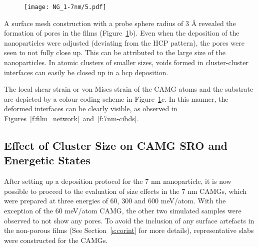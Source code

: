 \begin{figure}[!h] \centering
	\texttt{[image: NG\_1-7nm/5.pdf]}
	\label{f:7nm-cibdpores}
\end{figure}

A surface mesh construction \cite{Stukowski2010a,Stukowski2014} with a probe sphere radius of 3 \r{A} revealed the formation of pores in the films (Figure~\ref{f:7nm-cibdpores}b). Even when the deposition of the nanoparticles were adjusted (deviating from the HCP pattern), the pores were seen to not fully close up. This can be attributed to the large size of the nanoparticles. In atomic clusters of smaller sizes, voids formed in cluster-cluster interfaces can easily be closed up in a \gls{hcp} deposition. \par

The local shear strain or von Mises strain of the CAMG atoms and the substrate are depicted by a colour coding scheme in Figure~\ref{f:7nm-cibdpores}c. In this manner, the deformed interfaces can be clearly visible, as observed in Figures~\ref{f:film_network}~and~\ref{f:7nm-cibds}. \par

\subsection{Effect of Cluster Size on CAMG SRO and Energetic States}
After setting up a deposition protocol for the 7 nm nanoparticle, it is now possible to proceed to the evaluation of size effects in the 7 nm CAMGs, which were prepared at three energies of 60, 300 and 600 meV/atom. With the exception of the 60 meV/atom CAMG, the other two simulated samples were observed to not show any pores. To avoid the inclusion of any surface artefacts in the non-porous films (See Section~\ref{s:corint} for more details), representative slabs were constructed for the CAMGs. \par

